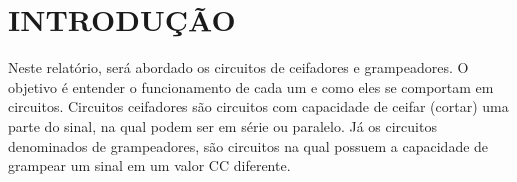 \chapter{INTRODUÇÃO}

Neste relatório, será abordado os circuitos de ceifadores e grampeadores. O objetivo é entender o funcionamento de cada um e como eles se comportam em circuitos.
Circuitos ceifadores são circuitos com capacidade de ceifar (cortar) uma parte do sinal, na qual podem ser em série ou paralelo. Já os circuitos denominados de grampeadores, são circuitos na qual possuem a capacidade de grampear um sinal em um valor CC diferente.
